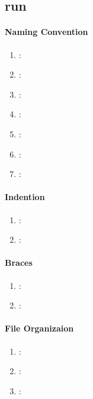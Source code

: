 \subsection{run} %
\label{sub:preinvokenotx}

\paragraph{Naming Convention} %
\label{par:naming_convention}

\begin{enumerate}
	\item \emph{\checkA}:
	\item \emph{\checkB}:
	\item \emph{\checkC}:
	\item \emph{\checkD}:
	\item \emph{\checkE}:
	\item \emph{\checkF}:
	\item \emph{\checkG}:
\end{enumerate}

\paragraph{Indention} %
\label{par:indention}

\begin{enumerate} [resume]
	\item \emph{\checkH}:
	\item \emph{\checkI}:
\end{enumerate}

\paragraph{Braces} %
\label{par:braces}

\begin{enumerate} [resume]
	\item \emph{\checkJ}:
	\item \emph{\checkK}:
\end{enumerate}

\paragraph{File Organizaion} %
\label{par:file_organizaion}

\begin{enumerate} [resume]
	\item \emph{\checkL}:
	\item \emph{\checkM}:
	\item \emph{\checkN}:
\end{enumerate}

